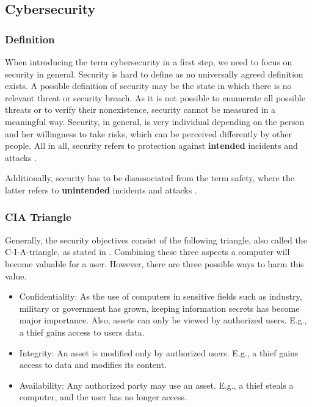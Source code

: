 \subsection{Cybersecurity}
\label{subsec:02_cybersecurity}

\subsubsection{Definition}

When introducing the term cybersecurity in a first step, we need to focus on security in general. Security is hard to define as no universally agreed definition exists. A possible definition of security may be the state in which there is no relevant threat or security breach. As it is not possible to enumerate all possible threats or to verify their nonexistence, security cannot be measured in a meaningful way. Security, in general, is very individual depending on the person and her willingness to take risks, which can be perceived differently by other people. All in all, security refers to protection against \textbf{intended} incidents and attacks \cite{Bishop2004, Pfleeger2014}.

Additionally, security has to be disassociated from the term safety, where the latter refers to \textbf{unintended} incidents and attacks \cite{Bishop2004}.

\subsubsection{CIA Triangle}
Generally, the security objectives consist of the following triangle, also called the C-I-A-triangle, as stated in \cite{Bishop2004}. Combining these three aspects a computer will become valuable for a user. However, there are three possible ways to harm this value.
\begin{itemize}
    \item Confidentiality: As the use of computers in sensitive fields such as industry, military or government has grown, keeping information secrets has become major importance. Also, assets can only be viewed by authorized users. E.g., a thief gains access to users data.
    \item Integrity: An asset is modified only by authorized users. E.g., a thief gains access to data and modifies its content.
    \item Availability: Any authorized party may use an asset. E.g., a thief steals a computer, and the user has no longer access.
\end{itemize}


